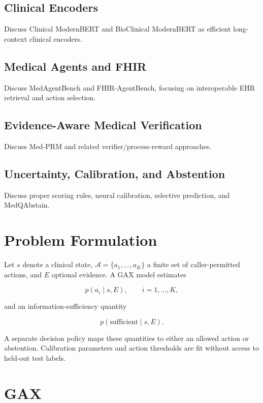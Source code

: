 \documentclass[11pt]{article}
\begin{document}
\subsection{Clinical Encoders}
Discuss Clinical ModernBERT and BioClinical ModernBERT as efficient long-context
clinical encoders.

\subsection{Medical Agents and FHIR}
Discuss MedAgentBench and FHIR-AgentBench, focusing on interoperable EHR
retrieval and action selection.

\subsection{Evidence-Aware Medical Verification}
Discuss Med-PRM and related verifier/process-reward approaches.

\subsection{Uncertainty, Calibration, and Abstention}
Discuss proper scoring rules, neural calibration, selective prediction, and
MedQAbstain.

\section{Problem Formulation}

Let $s$ denote a clinical state, $\mathcal{A}=\{a_1,\ldots,a_K\}$ a finite set of
caller-permitted actions, and $E$ optional evidence. A GAX model estimates

\begin{equation}
p(a_i \mid s,E), \qquad i=1,\ldots,K,
\end{equation}

and an information-sufficiency quantity

\begin{equation}
p(\mathrm{sufficient}\mid s,E).
\end{equation}

A separate decision policy maps these quantities to either an allowed action or
abstention. Calibration parameters and action thresholds are fit without access
to held-out test labels.

\section{GAX}
\end{document}

